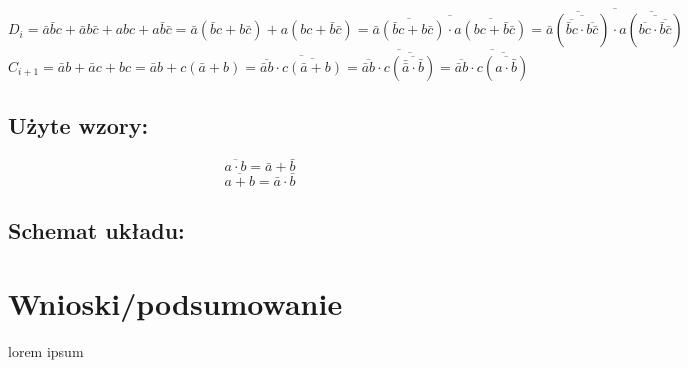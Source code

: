 \documentclass[12pt,a4paper]{article}
\begin{document}
			\begin{displaymath}
				D_i = \bar{a}\bar{b}c + \bar{a}b\bar{c} + abc + a\bar{b}\bar{c}
				= \bar{a}(\bar{b}c+b\bar{c}) + a(bc + \bar{b}\bar{c})
				= \overline{\overline{\bar{a}(\bar{b}c+b\bar{c})}\cdot\overline{a(bc + \bar{b}\bar{c})}}
				= \overline{\overline{\bar{a}(\overline{\overline{\bar{b}c}\cdot\overline{b\bar{c}}})}
					\cdot\overline{a(\overline{\overline{bc} \cdot \overline{\bar{b}\bar{c}}})}}
			\end{displaymath}
			\begin{displaymath}
				C_{i+1} = \bar{a}b+\bar{a}c+bc
				= \bar{a}b+c(\bar{a}+b)
				= \overline{\overline{\bar{a}b}\cdot\overline{c(\bar{a}+b)}}
				= \overline{\overline{\bar{a}b}\cdot\overline{c(\overline{\bar{\bar{a}}\cdot\bar{b}})}}
				= \overline{\overline{\bar{a}b}\cdot\overline{c(\overline{a\cdot\bar{b}})}}
			\end{displaymath}
			
		
		\subsection{Użyte wzory:}
			\begin{equation}
			\overline{a\cdot b}=\bar{a}+\bar{b}
			\end{equation}
			\begin{equation}
			\overline{a+b}=\bar{a}\cdot\bar{b}
			\end{equation}
			
		\subsection{Schemat układu:}

	\section{Wnioski/podsumowanie}
	
	lorem ipsum
	
\end{document}
